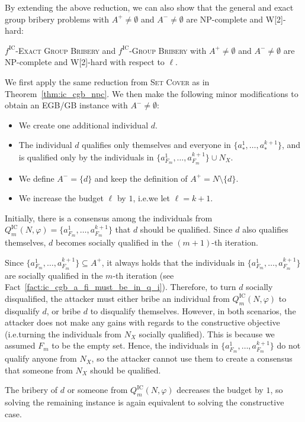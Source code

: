 \documentclass[
    12pt,               %
    a4paper,            %
    bibtotoc,           %
    pointlessnumbers,   %
    ngerman,            %
    titlepage,          %
    leqno,              %
    ]{scrarticle}       %
\newcommand\thmref{Theorem~\ref}
\newcommand\factref{Fact~\ref}
\begin{document}
By extending the above reduction, we can also show that the general and exact group bribery problems with $A^+ \neq \emptyset$ and $A^- \neq \emptyset$ are NP-complete and W[2]-hard:

\begin{Corollary} \label{cor:ic_gb_npc}
$f^{\text{IC}}$-\textsc{Exact Group Bribery} and $f^{\text{IC}}$-\textsc{Group Bribery} with $A^+ \neq \emptyset$ and $A^- \neq \emptyset$ are NP-complete and W[2]-hard with respect to $\ell$.
\end{Corollary}

\begin{Proof}
We first apply the same reduction from \textsc{Set Cover} as in \thmref{thm:ic_cgb_npc}. We then make the following minor modifications to obtain an EGB/GB instance with $A^- \neq \emptyset$:

\begin{itemize}[nolistsep]
\item
We create one additional individual $d$.
\item
The individual $d$ qualifies only themselves and everyone in $\{ a^1_\ast, \ldots, a^{k+1}_\ast \}$, and is qualified only by the individuals in $\{ a^1_{F_m}, \ldots, a^{k+1}_{F_m} \} \cup N_X$.
\item
We define $A^- = \{d\}$ and keep the definition of $A^+ = N \setminus \{d\}$.
\item
We increase the budget $\ell$ by $1$, i.e.\@ we let $\ell = k+1$.
\end{itemize}

Initially, there is a consensus among the individuals from $Q^{\text{IC}}_m(N, \varphi) = \{ a^1_{F_m}, \ldots, a^{k+1}_{F_m} \}$ that $d$ should be qualified. Since $d$ also qualifies themselves, $d$ becomes socially qualified in the $(m+1)$-th iteration.

Since $\{ a^1_{F_m}, \ldots, a^{k+1}_{F_m} \} \subseteq A^+$, it always holds that the individuals in $\{ a^1_{F_m}, \ldots, a^{k+1}_{F_m} \}$ are socially qualified in the $m$-th iteration (see \factref{fact:ic_cgb_a_fi_must_be_in_q_i}). Therefore, to turn $d$ socially disqualified, the attacker must either bribe an individual from $Q^{\text{IC}}_m(N, \varphi)$ to disqualify $d$, or bribe $d$ to disqualify themselves. However, in both scenarios, the attacker does not make any gains with regards to the constructive objective (i.e.\@ turning the individuals from $N_X$ socially qualified). This is because we assumed $F_m$ to be the empty set. Hence, the individuals in $\{ a^1_{F_m}, \ldots, a^{k+1}_{F_m} \}$ do not qualify anyone from $N_X$, so the attacker cannot use them to create a consensus that someone from $N_X$ should be qualified.

The bribery of $d$ or someone from $Q^{\text{IC}}_m(N, \varphi)$ decreases the budget by $1$, so solving the remaining instance is again equivalent to solving the constructive case.
\end{Proof}
\end{document}
